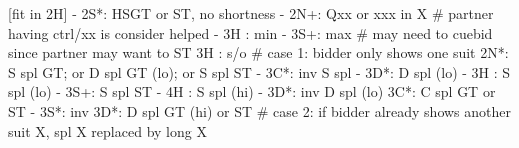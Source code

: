 [fit in 2H] - 
2S*: HSGT or ST, no shortness
   - 2N+: Qxx or xxx in X  # partner having ctrl/xx is consider helped
   - 3H : min
   - 3S+: max  # may need to cuebid since partner may want to ST
3H : s/o 
# case 1: bidder only shows one suit
2N*: S spl GT; or D spl GT (lo); or S spl ST
   - 3C*: inv S spl
        - 3D*: D spl (lo)
        - 3H : S spl (lo)
        - 3S+: S spl ST
        - 4H : S spl (hi)
   - 3D*: inv D spl (lo)
3C*: C spl GT or ST
   - 3S*: inv
3D*: D spl GT (hi) or ST
# case 2: if bidder already shows another suit X, spl X replaced by long X
